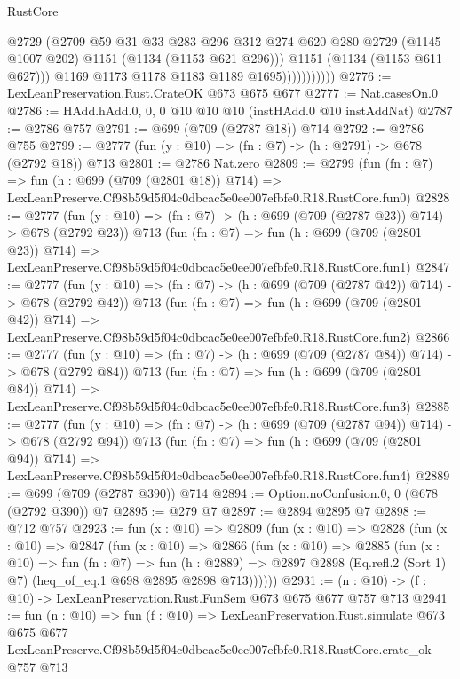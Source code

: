 \begin{lexlean}{RustCore}
\begin{coremodule}
                            @2729
                            (@2709
                              @59
                              @31
                              @33
                              @283
                              @296
                              @312
                              @274
                              @620
                              @280
                              @2729
                              (@1145 @1007 @202)
                              @1151
                              (@1134 (@1153 @621 @296)))
                            @1151
                            (@1134 (@1153 @611 @627)))
                          @1169
                          @1173
                          @1178
                          @1183
                          @1189
                          @1695)))))))))))
@2776 := LexLeanPreservation.Rust.CrateOK @673 @675 @677
@2777 := Nat.casesOn.{0}
@2786 := HAdd.hAdd.{0, 0, 0} @10 @10 @10 (instHAdd.{0} @10 instAddNat)
@2787 := @2786 @757
@2791 := @699 (@709 (@2787 @18)) @714
@2792 := @2786 @755
@2799 := @2777 (fun (y : @10) => (fn : @7) -> (h : @2791) -> @678 (@2792 @18)) @713
@2801 := @2786 Nat.zero
@2809 := @2799
    (fun (fn : @7) =>
    fun (h : @699 (@709 (@2801 @18)) @714) =>
    LexLeanPreserve.Cf98b59d5f04c0dbcac5e0ee007efbfe0.R18.RustCore.fun0)
@2828 := @2777
    (fun (y : @10) => (fn : @7) -> (h : @699 (@709 (@2787 @23)) @714) -> @678 (@2792 @23))
    @713
    (fun (fn : @7) =>
    fun (h : @699 (@709 (@2801 @23)) @714) =>
    LexLeanPreserve.Cf98b59d5f04c0dbcac5e0ee007efbfe0.R18.RustCore.fun1)
@2847 := @2777
    (fun (y : @10) => (fn : @7) -> (h : @699 (@709 (@2787 @42)) @714) -> @678 (@2792 @42))
    @713
    (fun (fn : @7) =>
    fun (h : @699 (@709 (@2801 @42)) @714) =>
    LexLeanPreserve.Cf98b59d5f04c0dbcac5e0ee007efbfe0.R18.RustCore.fun2)
@2866 := @2777
    (fun (y : @10) => (fn : @7) -> (h : @699 (@709 (@2787 @84)) @714) -> @678 (@2792 @84))
    @713
    (fun (fn : @7) =>
    fun (h : @699 (@709 (@2801 @84)) @714) =>
    LexLeanPreserve.Cf98b59d5f04c0dbcac5e0ee007efbfe0.R18.RustCore.fun3)
@2885 := @2777
    (fun (y : @10) => (fn : @7) -> (h : @699 (@709 (@2787 @94)) @714) -> @678 (@2792 @94))
    @713
    (fun (fn : @7) =>
    fun (h : @699 (@709 (@2801 @94)) @714) =>
    LexLeanPreserve.Cf98b59d5f04c0dbcac5e0ee007efbfe0.R18.RustCore.fun4)
@2889 := @699 (@709 (@2787 @390)) @714
@2894 := Option.noConfusion.{0, 0} (@678 (@2792 @390)) @7
@2895 := @279 @7
@2897 := @2894 @2895 @7
@2898 := @712 @757
@2923 := fun (x : @10) =>
  @2809
    (fun (x : @10) =>
    @2828
      (fun (x : @10) =>
      @2847
        (fun (x : @10) =>
        @2866
          (fun (x : @10) =>
          @2885
            (fun (x : @10) =>
            fun (fn : @7) =>
            fun (h : @2889) =>
            @2897 @2898 (Eq.refl.{2} (Sort 1) @7) (heq_of_eq.{1} @698 @2895 @2898 @713))))))
@2931 := (n : @10) -> (f : @10) -> LexLeanPreservation.Rust.FunSem @673 @675 @677 @757 @713
@2941 := fun (n : @10) =>
  fun (f : @10) =>
  LexLeanPreservation.Rust.simulate
    @673
    @675
    @677
    LexLeanPreserve.Cf98b59d5f04c0dbcac5e0ee007efbfe0.R18.RustCore.crate_ok
    @757
    @713
\end{coremodule}
\end{lexlean}
